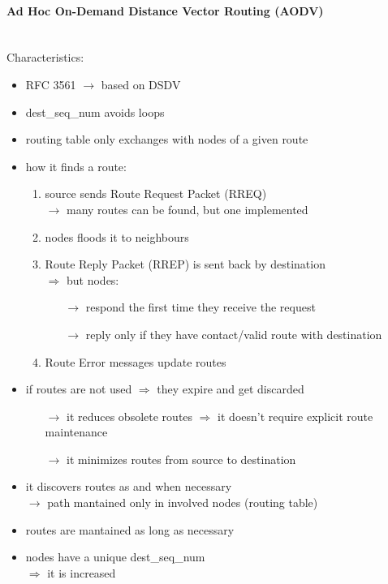\paragraph{Ad Hoc On-Demand Distance Vector Routing (AODV)}\mbox{}\\[0.2cm]
Characteristics:
\begin{itemize}
    \item RFC 3561 $\rightarrow$ based on DSDV
    \item dest\_seq\_num avoids loops
    \item routing table only exchanges with nodes of a given route
    \item how it finds a route:
    \begin{enumerate}
        \item source sends Route Request Packet (RREQ)\\$\rightarrow$ many routes can be found, but one implemented
        \item nodes floods it to neighbours
        \item Route Reply Packet (RREP) is sent back by destination\\
        $\Rightarrow$ but nodes:
        \begin{itemize}
            \item[$\rightarrow$] respond the first time they receive the request
            \item[$\rightarrow$] reply only if they have contact/valid route with destination
        \end{itemize}
        \item Route Error messages update routes
    \end{enumerate}
    \item if routes are not used $\Rightarrow$ they expire and get discarded
    \begin{itemize}
        \item[$\rightarrow$] it reduces obsolete routes $\Rightarrow$ it doesn't require explicit route maintenance
        \item[$\rightarrow$] it minimizes routes from source to destination
    \end{itemize}
        \item it discovers routes as and when necessary\\$\rightarrow$ path mantained only in involved nodes (routing table)
        \item routes are mantained as long as necessary
        \item nodes have a unique dest\_seq\_num\\$\Rightarrow$ it is increased

\end{itemize}
